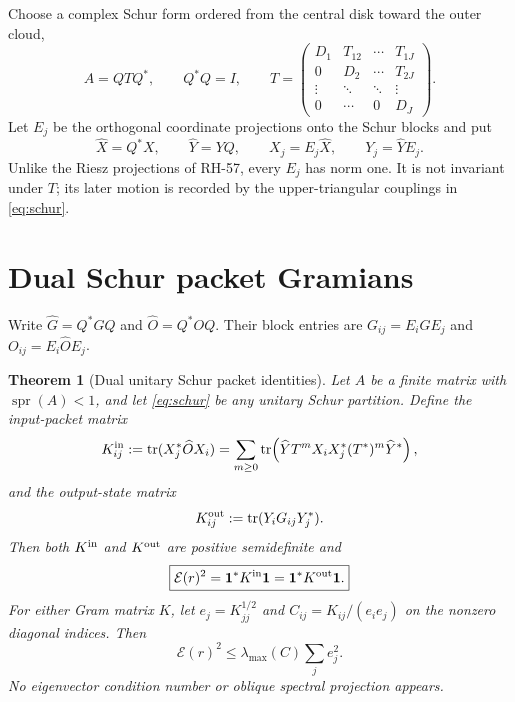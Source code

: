 \documentclass[11pt]{article}
\newtheorem{theorem}{Theorem}[section]
\theoremstyle{remark}
\newcommand{\cE}{\mathcal E}
\newcommand{\tr}{\operatorname{tr}}
\newcommand{\spr}{\operatorname{spr}}
\begin{document}
Choose a complex Schur form ordered from the central disk toward the outer
cloud,
\begin{equation}
 A=QTQ^*,\qquad Q^*Q=I,
 \qquad
 T=\begin{pmatrix}
 D_1&T_{12}&\cdots&T_{1J}\\
 0&D_2&\cdots&T_{2J}\\
 \vdots&\ddots&\ddots&\vdots\\
 0&\cdots&0&D_J
 \end{pmatrix}.
 \label{eq:schur}
\end{equation}
Let $E_j$ be the orthogonal coordinate projections onto the Schur blocks and
put
\begin{equation}
 \widehat X=Q^*X,
 \qquad \widehat Y=YQ,
 \qquad X_j=E_j\widehat X,
 \qquad Y_j=\widehat YE_j.
 \label{eq:packets}
\end{equation}
Unlike the Riesz projections of RH-57, every $E_j$ has norm one.  It is not
invariant under $T$; its later motion is recorded by the upper-triangular
couplings in \eqref{eq:schur}.

\section{Dual Schur packet Gramians}
\label{sec:dual}

Write $\widehat G=Q^*GQ$ and $\widehat O=Q^*OQ$.  Their block entries are
$G_{ij}=E_i\widehat GE_j$ and $O_{ij}=E_i\widehat OE_j$.

\begin{theorem}[Dual unitary Schur packet identities]
\label{thm:dual}
Let $A$ be a finite matrix with $\spr(A)<1$, and let
\eqref{eq:schur} be any unitary Schur partition.  Define the input-packet
matrix
\begin{equation}
 K^{\rm in}_{ij}:=\tr(X_j^*\widehat OX_i)
 =\sum_{m\ge0}\tr\!\left(
   \widehat YT^mX_iX_j^*(T^*)^m\widehat Y^*
 \right),
 \label{eq:input-gram}
\end{equation}
and the output-state matrix
\begin{equation}
 K^{\rm out}_{ij}:=\tr(Y_iG_{ij}Y_j^*).
 \label{eq:output-gram}
\end{equation}
Then both $K^{\rm in}$ and $K^{\rm out}$ are positive semidefinite and
\begin{equation}
 \boxed{
 \cE(r)^2
 =\mathbf1^*K^{\rm in}\mathbf1
 =\mathbf1^*K^{\rm out}\mathbf1.}
 \label{eq:dual-reconstruction}
\end{equation}
For either Gram matrix $K$, let $e_j=K_{jj}^{1/2}$ and
$C_{ij}=K_{ij}/(e_ie_j)$ on the nonzero diagonal indices.  Then
\begin{equation}
 \cE(r)^2
 \le\lambda_{\max}(C)\sum_je_j^2.
 \label{eq:packet-coherence}
\end{equation}
No eigenvector condition number or oblique spectral projection appears.
\end{theorem}
\end{document}
